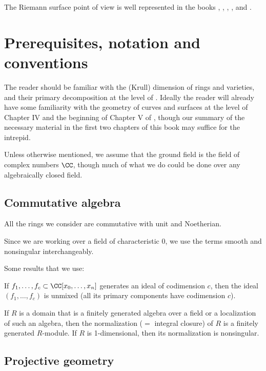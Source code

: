  The Riemann surface point of view is well represented in the books \cite{Forster}, \cite{Gunning}, \cite{Gunning-2}, \cite{Kirwan}, and \cite{Miranda}. 


\section*{Prerequisites, notation and conventions}
The reader should be familiar with the 
(Krull)
dimension of rings and
%
%
varieties, and their 
primary decomposition 
at the level of
\cite{Atiyah-MacDonald}. Ideally the reader  will already have some
familiarity with the geometry of curves and surfaces 
at the level of 
Chapter IV and the beginning of Chapter V of
\cite{Hartshorne1977}, though our summary of the necessary material
in the first two chapters of this book may suffice for the intrepid.

Unless otherwise mentioned, we assume that the ground field is the field of complex numbers $\CC$, though much of what we do
could be done over any algebraically closed field.

\subsection*{Commutative algebra} 
All the rings we consider are commutative with unit and Noetherian.

Since we are working over  a field of characteristic 0, we use the
terms smooth and nonsingular interchangeably.

Some results that we use:
 \begin{theorem}\label{Lasker}
If $f_1,\dots, f_c \subset \CC[x_0,\dots, x_n]$ generates an ideal of codimension $c$, then 
the ideal $(f_1,\dots, f_c)$ is unmixed (all its primary components have codimension $c$).
%
\end{theorem}

\begin{theorem}\label{finiteness of normalization}
 If $R$ is a domain that is a finitely generated algebra over a field or a localization of such an algebra, then the
normalization ($=$ integral closure) of $R$ is a finitely generated $R$-module.
If $R$ is 1-dimensional, then its normalization is nonsingular.
\end{theorem}

\subsection*{Projective geometry}
 

